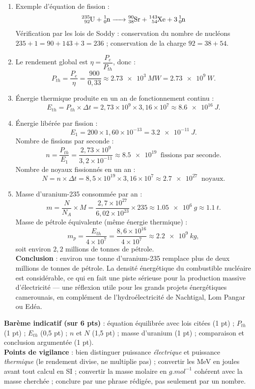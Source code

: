 \documentclass[11pt]{article}
\begin{document}
\begin{corrige}
\begin{enumerate}
\item Exemple d'équation de fission :
\[ \ce{^{235}_{92}U + ^{1}_{0}n -> ^{90}_{38}Sr + ^{143}_{54}Xe + 3^{1}_{0}n} \]
Vérification par les lois de Soddy : conservation du nombre de nucléons $235 + 1 = 90 + 143 + 3 = 236$ ; conservation de la charge $92 = 38 + 54$.
\item Le rendement global est $\eta = \dfrac{P_e}{P_{th}}$, donc :
\[ P_{th} = \frac{P_e}{\eta} = \frac{900}{0,33} \approx \SI{2,73e3}{MW} = \SI{2,73e9}{W}. \]
\item Énergie thermique produite en un an de fonctionnement continu :
\[ E_{th} = P_{th} \times \Delta t = 2,73\times 10^{9} \times 3,16\times 10^{7} \approx \SI{8,6e16}{J}. \]
\item Énergie libérée par fission :
\[ E_1 = 200 \times 1,60\times 10^{-13} = \SI{3,2e-11}{J}. \]
Nombre de fissions par seconde :
\[ n = \frac{P_{th}}{E_1} = \frac{2,73\times 10^{9}}{3,2\times 10^{-11}} \approx \SI{8,5e19}{} \text{ fissions par seconde}. \]
Nombre de noyaux fissionnés en un an :
\[ N = n \times \Delta t = 8,5\times 10^{19} \times 3,16\times 10^{7} \approx \SI{2,7e27}{} \text{ noyaux}. \]
\item Masse d'uranium-235 consommée par an :
\[ m = \frac{N}{N_A}\times M = \frac{2,7\times 10^{27}}{6,02\times 10^{23}} \times 235 \approx \SI{1,05e6}{g} \approx \SI{1,1}{t}. \]
Masse de pétrole équivalente (même énergie thermique) :
\[ m_p = \frac{E_{th}}{4\times 10^{7}} = \frac{8,6\times 10^{16}}{4\times 10^{7}} \approx \SI{2,2e9}{kg}, \]
soit environ $2,2$ millions de tonnes de pétrole.\\
\textbf{Conclusion} : environ une tonne d'uranium-235 remplace plus de deux millions de tonnes de pétrole. La densité énergétique du combustible nucléaire est considérable, ce qui en fait une piste sérieuse pour la production massive d'électricité — une réflexion utile pour les grands projets énergétiques camerounais, en complément de l'hydroélectricité de Nachtigal, Lom Pangar ou Edéa.
\end{enumerate}
\textbf{Barème indicatif (sur 6 pts)} : équation équilibrée avec lois citées (1 pt) ; $P_{th}$ (1 pt) ; $E_{th}$ (0,5 pt) ; $n$ et $N$ (1,5 pt) ; masse d'uranium (1 pt) ; comparaison et conclusion argumentée (1 pt).\\
\textbf{Points de vigilance} : bien distinguer puissance \emph{électrique} et puissance \emph{thermique} (le rendement divise, ne multiplie pas) ; convertir les MeV en joules avant tout calcul en SI ; convertir la masse molaire en $\si{g.mol^{-1}}$ cohérent avec la masse cherchée ; conclure par une phrase rédigée, pas seulement par un nombre.
\end{corrige}
\end{document}
